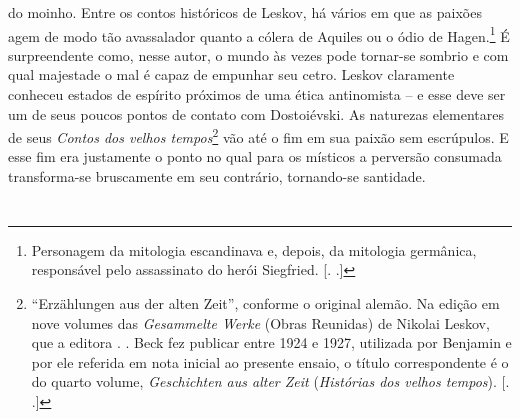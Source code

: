 do moinho. Entre os contos históricos de Leskov, há vários em que as
paixões agem de modo tão avassalador quanto a cólera de Aquiles ou o
ódio de Hagen.\footnote{Personagem da mitologia escandinava e, depois,
  da mitologia germânica, responsável pelo assassinato do herói
  Siegfried. [. .]} É surpreendente como, nesse autor, o mundo
às vezes pode tornar-se sombrio e com qual majestade o mal é capaz de
empunhar seu cetro. Leskov claramente conheceu estados de espírito
próximos de uma ética antinomista -- e esse deve ser um de seus poucos
pontos de contato com Dostoiévski. As naturezas elementares de seus
\emph{Contos dos velhos tempos}\footnote{``Erzählungen aus der alten
  Zeit'', conforme o original alemão. Na edição
  em nove volumes das \emph{Gesammelte Werke} (Obras Reunidas) de
  Nikolai Leskov, que a editora . . Beck fez publicar entre 1924 e
  1927, utilizada por Benjamin e por ele referida em nota inicial ao
  presente ensaio, o título correspondente é o do quarto
  volume, \emph{Geschichten aus alter Zeit} (\emph{Histórias dos velhos tempos}).
  [. .]} vão até o fim em sua paixão sem escrúpulos. E esse
fim era justamente o ponto no qual para os místicos a perversão
consumada transforma-se bruscamente em seu contrário, tornando-se
santidade.

\section{}

